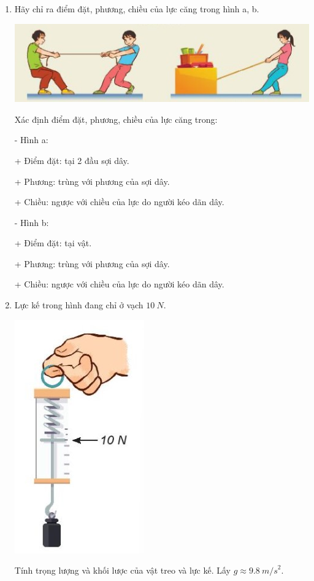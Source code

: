 \setcounter{section}{0}

\begin{enumerate}[label=\bfseries Câu \arabic*:]
	\item {}
	
	
	{Hãy chỉ ra điểm đặt, phương, chiều của lực căng trong hình a, b.
		\begin{center}
			\includegraphics[scale=1]{../figs/VN10-2022-PH-TP019-3.jpg}
		\end{center}
	}
	
	\hideall
	{
		Xác định điểm đặt, phương, chiều của lực căng trong:
		
		- Hình a:
		
		+ Điểm đặt: tại 2 đầu sợi dây.
		
		+ Phương: trùng với phương của sợi dây.
		
		+ Chiều: ngược với chiều của lực do người kéo dãn dây.
		
		- Hình b:
		
		+ Điểm đặt: tại vật.
		
		+ Phương: trùng với phương của sợi dây.
		
		+ Chiều: ngược với chiều của lực do người kéo dãn dây.
	
	}
	\item {}
	
	{
		Lực kế trong hình đang chỉ ở vạch $\SI{10}{N}$.
		\begin{center}
			\includegraphics[scale=1]{../figs/VN10-2022-PH-TP019-1.jpg}
		\end{center}
		Tính trọng lượng và khối lược của vật treo và lực kế. Lấy $g \approx \SI{9,8}{m/s}^2$.
			
}
\end{enumerate}
